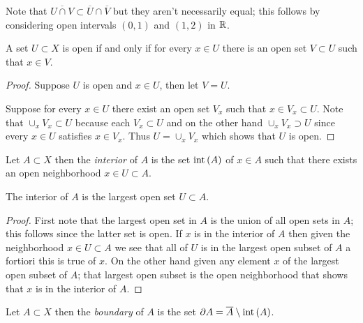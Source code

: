 Note that $\overline{U \cap V} \subset \overline{U} \cap \overline{V}$ but they aren't necessarily equal; this follows by considering open intervals $(0,1)$ and $(1,2)$ in $\mathbb{R}$.

\begin{lem}\label{OpenAlternative}A set $U \subset X$ is open if and only if for every $x \in
  U$ there is an open set $V \subset U$ such that $x \in V$.
\end{lem}
\begin{proof}
Suppose $U$ is open and $x \in U$, then let $V = U$.

Suppose for every $x \in U$ there exist an open set $V_x$ such that $x
\in V_x \subset U$.  Note that $\cup_x V_x \subset U$ because each
$V_x \subset U$ and on the other hand $\cup_x V_x \supset U$ since
every $x \in U$ satisfies $x \in V_x$.  Thus $U = \cup_x V_x$ which
shows that $U$ is open.
\end{proof}

\begin{defn}Let $A \subset X$ then the \emph{interior} of $A$ is the set $\operatorname*{int} \left( A \right)$ of
  $x \in A$ such that there exists an open neighborhood $x \in U \subset A$.
\end{defn}

\begin{prop}The interior of $A$ is the largest open set $U \subset A$.
\end{prop}
\begin{proof}
First note that the largest open set in $A$ is the union of all open sets in $A$; this follows since
the latter set is open.  If $x$ is in the interior of $A$ then given the neighborhood $x \in U \subset A$ 
we see that all of $U$ is in the largest open subset of $A$ a fortiori this is true of $x$.  On the other hand given 
any element $x$ of the largest open subset of $A$; that largest open subset is the open neighborhood that shows 
that $x$ is in the interior of $A$.
\end{proof}

\begin{defn}Let $A \subset X$ then the \emph{boundary} of $A$ is the set $\partial A = \overline{A} \setminus \operatorname*{int} \left( A \right)$.
\end{defn}

